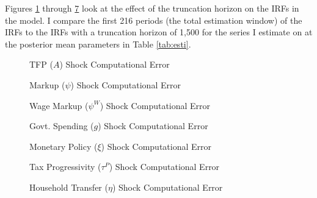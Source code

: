 Figures \ref{fig:A-comp-err} through \ref{fig:eta-comp-err} look at the effect of the truncation horizon on the IRFs in the model. I compare the first 216 periods (the total estimation window) of the IRFs to the IRFs with a truncation horizon of 1,500 for the series I estimate on at the posterior mean parameters in Table \ref{tab:esti}.

\begin{figure}[ht]
    \centering
    \caption{TFP ($A$) Shock Computational Error}
    
    \label{fig:A-comp-err}
\end{figure}

\begin{figure}[ht]
    \centering
    \caption{Markup ($\psi$) Shock Computational Error}
    
    \label{fig:psi-comp-err}
\end{figure}

\begin{figure}[ht]
    \centering
    \caption{Wage Markup ($\psi^W$) Shock Computational Error}
    
    \label{fig:psiW-comp-err}
\end{figure}

\begin{figure}[ht]
    \centering
    \caption{Govt. Spending ($g$) Shock Computational Error}
    
    \label{fig:g-comp-err}
\end{figure}

\begin{figure}[ht]
    \centering
    \caption{Monetary Policy ($\xi$) Shock Computational Error}
    
    \label{fig:xi-comp-err}
\end{figure}

\begin{figure}[ht]
    \centering
    \caption{Tax Progressivity ($\tau^P$) Shock Computational Error}
    
    \label{fig:tauP-comp-err}
\end{figure}

\begin{figure}[ht]
    \centering
    \caption{Household Transfer ($\eta$) Shock Computational Error}
    
    \label{fig:eta-comp-err}
\end{figure}
